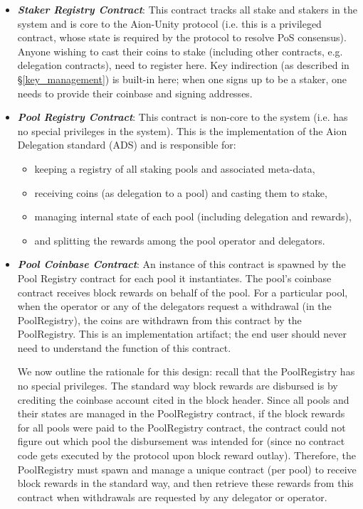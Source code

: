 \begin{itemize}
    \item \textbf{\textit{Staker Registry Contract}}: This contract tracks all stake and stakers in the system and is core to the Aion-Unity protocol (i.e. this is a privileged contract, whose state is required by the protocol to resolve PoS consensus). Anyone wishing to cast their coins to stake (including other contracts, e.g. delegation contracts), need to register here. Key indirection (as described in \S\ref{key_management}) is built-in here; when one signs up to be a staker, one needs to provide their coinbase and signing addresses. 
    \item \textbf{\textit{Pool Registry Contract}}: This contract is non-core to the system (i.e. has no special privileges in the system). This is the implementation of the Aion Delegation standard (ADS) and is responsible for: 
    \begin{itemize}[label=--,nosep]
        \item keeping a registry of all staking pools and associated meta-data,
        \item receiving coins (as delegation to a pool) and casting them to stake, 
        \item managing internal state of each pool (including delegation and rewards),
        \item and splitting the rewards among the pool operator and delegators. 
    \end{itemize}
    
    \item \textbf{\textit{Pool Coinbase Contract}}: An instance of this contract is spawned by the Pool Registry contract for each pool it instantiates. The pool's coinbase contract receives block rewards on behalf of the pool. For a particular pool, when the operator or any of the delegators request a withdrawal (in the PoolRegistry), the coins are withdrawn from this contract by the PoolRegistry. This is an implementation artifact; the end user should never need to understand the function of this contract. 
    
    We now outline the rationale for this design: recall that the PoolRegistry has no special privileges. The standard way block rewards are disbursed is by crediting the coinbase account cited in the block header. Since all pools and their states are managed in the PoolRegistry contract, if the block rewards for all pools were paid to the PoolRegistry contract, the contract could not figure out which pool the disbursement was intended for (since no contract code gets executed by the protocol upon block reward outlay). Therefore, the PoolRegistry must spawn and manage a unique contract (per pool) to receive block rewards in the standard way, and then retrieve these rewards from this contract when withdrawals are requested by any delegator or operator.  
\end{itemize}

